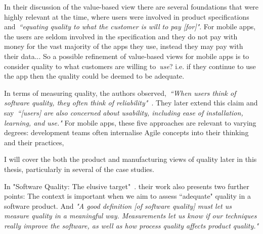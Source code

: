 In their discussion of the value-based view there are several foundations that were highly relevant at the time, where users were involved in product specifications and~\emph{``equating quality to what the customer is will to pay [for]"}. For mobile apps, the users are seldom involved in the specification and they do not pay with money for the vast majority of the apps they use, instead they may pay with their data... So a possible refinement of value-based views for mobile apps is to consider quality to what customers are willing to~\emph{use}? i.e. if they continue to use the app then the quality could be deemed to be adequate.

In terms of measuring quality, the authors observed,~\emph{``When users think of software quality, they often think of reliability"}~\citep{kitchenham1996_software_quality_elusive_target}. They later extend this claim and say~\emph{``[users] are also concerned about usability, including ease of installation, learning, and use."}
%
For mobile apps, these five approaches are relevant to varying degrees: development teams often internalise Agile concepts into their thinking and their practices, %

I will cover the both the product and manufacturing views of quality later in this thesis, particularly in several of the case studies.



In "Software Quality: The elusive target"~\cite{kitchenham1996_software_quality_elusive_target}. their work also presents two further points: The context is important when we aim to assess ``adequate" quality in a software product. And \emph{"A good definition [of software quality] must let us measure quality in a meaningful way. Measurements let us know if our techniques really improve the software, as well as how process quality affects product quality."}


